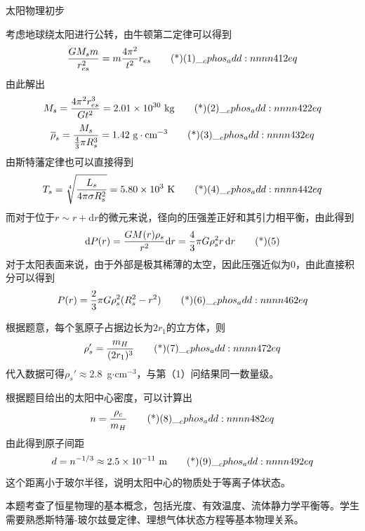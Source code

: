 \documentclass[exam]{cphos}
\begin{document}
\begin{problem}[40]{太阳物理初步}
\begin{solution}
考虑地球绕太阳进行公转，由牛顿第二定律可以得到
\begin{equation}
    \frac{GM_s m}{r_{es}^2} = m \frac{4\pi^2}{t^2} r_{es} \eqtagscore{1}{2}
\end{equation}
由此解出
\begin{equation}
    M_s = \frac{4\pi^2 r_{es}^3}{Gt^2} = 2.01 \times 10^{30} \text{ kg} \eqtagscore{2}{2}
\end{equation}
\begin{equation}
    \overline{\rho}_s = \frac{M_s}{\frac{4}{3}\pi R_s^3} = 1.42 \text{ g}\cdot\text{cm}^{-3} \eqtagscore{3}{2}
\end{equation}
由斯特藩定律也可以直接得到
\begin{equation}
    T_s = \sqrt[4]{\frac{L_s}{4\pi\sigma R_s^2}} = 5.80 \times 10^{3} \text{ K} \eqtagscore{4}{2}
\end{equation}
而对于位于$r\sim r+\mathrm{d}r$的微元来说，径向的压强差正好和其引力相平衡，由此得到
\begin{equation}
    \mathrm{d}P(r) = \frac{GM(r)\rho_s}{r^2}\mathrm{d}r = \frac{4}{3}\pi G\rho_s^2 r\,\mathrm{d}r \eqtag{5}
\end{equation}
对于太阳表面来说，由于外部是极其稀薄的太空，因此压强近似为0，由此直接积分可以得到
\begin{equation}
    P(r) = \frac{2}{3}\pi G\rho_s^2(R_s^2 - r^2) \eqtagscore{6}{2}
\end{equation}

根据题意，每个氢原子占据边长为$2r_1$的立方体，则
\begin{equation}
    \rho_s' = \frac{m_H}{(2r_1)^3} \eqtagscore{7}{2}
\end{equation}
代入数据可得$\rho_s' \approx 2.8$~g$\cdot$cm$^{-3}$，与第（1）问结果同一数量级。

根据题目给出的太阳中心密度，可以计算出
\begin{equation}
    n = \frac{\rho_c}{m_H} \eqtagscore{8}{2}
\end{equation}
由此得到原子间距
\begin{equation}
    d = n^{-1/3} \approx 2.5 \times 10^{-11} \text{ m} \eqtagscore{9}{2}
\end{equation}
这个距离小于玻尔半径，说明太阳中心的物质处于等离子体状态。

\scoring

\end{solution}

\begin{problemappendix}
本题考查了恒星物理的基本概念，包括光度、有效温度、流体静力学平衡等。学生需要熟悉斯特藩-玻尔兹曼定律、理想气体状态方程等基本物理关系。
\end{problemappendix}

\end{problem}
\end{document}
